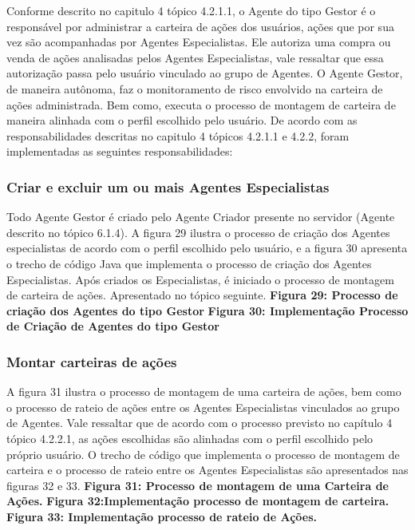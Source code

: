 Conforme descrito no capitulo 4 tópico 4.2.1.1, o Agente do tipo Gestor é o responsável por administrar a carteira de ações dos usuários, ações que por sua vez são acompanhadas por Agentes Especialistas. Ele autoriza uma compra ou venda de ações analisadas pelos Agentes Especialistas, vale ressaltar que essa autorização passa pelo usuário vinculado ao grupo de Agentes. O Agente Gestor, de maneira autônoma, faz o monitoramento de risco envolvido na carteira de ações administrada. Bem como, executa o processo de montagem de carteira de maneira alinhada com o perfil escolhido pelo usuário. De acordo com as responsabilidades descritas no capitulo 4 tópicos 4.2.1.1 e 4.2.2, foram implementadas as seguintes responsabilidades: 

\subsubsection{Criar e excluir um ou mais Agentes Especialistas}

Todo Agente Gestor é criado pelo Agente Criador presente no servidor (Agente descrito no tópico 6.1.4). A figura 29 ilustra o processo de criação dos Agentes especialistas de acordo com o perfil escolhido pelo usuário, e a figura 30 apresenta o trecho de código Java que implementa o processo de criação dos Agentes Especialistas.  Após criados os Especialistas, é iniciado o processo de montagem de carteira de ações. Apresentado no tópico seguinte.
\textbf{Figura 29: Processo de criação dos Agentes do tipo Gestor}
\textbf{Figura 30: Implementação Processo de Criação de Agentes do tipo Gestor}

\subsubsection{Montar carteiras de ações}

A figura 31 ilustra o processo de montagem de uma carteira de ações, bem como o processo de rateio de ações entre os Agentes Especialistas vinculados ao grupo de Agentes. Vale ressaltar que de acordo com o processo previsto no capítulo 4 tópico 4.2.2.1, as ações escolhidas são alinhadas com o perfil escolhido pelo próprio usuário. O trecho de código que implementa o processo de montagem de carteira e o processo de rateio entre os Agentes Especialistas são apresentados nas figuras 32 e 33.
\textbf{Figura 31: Processo de montagem de uma Carteira de Ações.}
\textbf{Figura 32:Implementação processo de montagem de carteira.}
\textbf{Figura 33: Implementação processo de rateio de Ações.}

